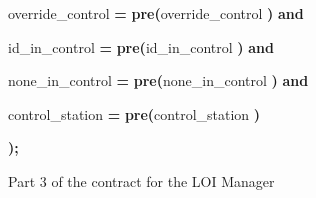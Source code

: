 \begin{figure}
{{override\_control {\color{color18} \textbf{=}} {\color{color18} \textbf{pre(}}override\_control{\color{color18} \textbf{)}} 
{\color{color18} \textbf{and  }}

id\_in\_control {\color{color18} \textbf{=}} {\color{color18} \textbf{pre(}}id\_in\_control{\color{color18} \textbf{)}} 
{\color{color18} \textbf{and  }}

none\_in\_control {\color{color18} \textbf{=}} {\color{color18} \textbf{pre(}}none\_in\_control{\color{color18} \textbf{)}} 
{\color{color18} \textbf{and}}   

control\_station {\color{color18} \textbf{=}} {\color{color18} \textbf{pre(}}control\_station{\color{color18} \textbf{) 
 }}

\parindent=0pt
{\color{color18} \textbf{);      }}

}%
}
\caption{Part 3 of the contract for the LOI Manager}
\label{fig:loi-contract3}
\end{figure}

